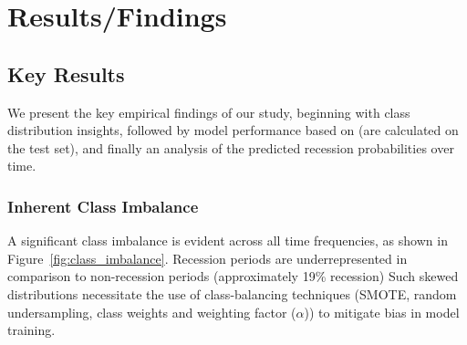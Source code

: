 \section{Results/Findings}


\begin{comment}
\begin{itemize}
    \item Key Results: Present your main findings clearly, using charts, graphs, or diagrams where necessary.
    \item Data Interpretation: Explain the significance of the results in the context of your research objectives.
    \item Unexpected Outcomes: Highlight any results that were unexpected and how they impact your project.
\end{itemize}
\end{comment}








\subsection{Key Results}

We present the key empirical findings of our study, beginning with class distribution insights, followed by model performance based on \AUCone (\AUCtwos are calculated on the test set), and finally an analysis of the predicted recession probabilities over time.

\subsubsection{Inherent Class Imbalance}

A significant class imbalance is evident across all time frequencies, as shown in Figure~\ref{fig:class_imbalance}. Recession periods are underrepresented in comparison to non-recession periods (approximately 19\% recession) Such skewed distributions necessitate the use of class-balancing techniques (SMOTE, random undersampling, class weights and weighting factor ($\alpha$)) to mitigate bias in model training.


